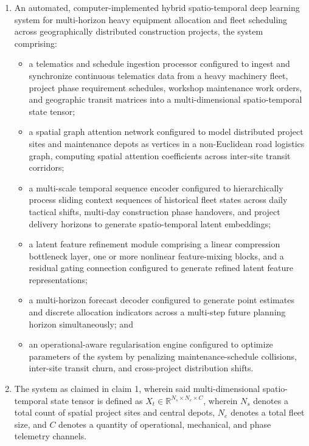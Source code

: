 \documentclass[11pt,a4paper]{article}
\begin{document}
\begin{enumerate}
    \item An automated, computer-implemented hybrid spatio-temporal deep learning system for multi-horizon heavy equipment allocation and fleet scheduling across geographically distributed construction projects, the system comprising:
    \begin{itemize}
        \item a telematics and schedule ingestion processor configured to ingest and synchronize continuous telematics data from a heavy machinery fleet, project phase requirement schedules, workshop maintenance work orders, and geographic transit matrices into a multi-dimensional spatio-temporal state tensor;
        \item a spatial graph attention network configured to model distributed project sites and maintenance depots as vertices in a non-Euclidean road logistics graph, computing spatial attention coefficients across inter-site transit corridors;
        \item a multi-scale temporal sequence encoder configured to hierarchically process sliding context sequences of historical fleet states across daily tactical shifts, multi-day construction phase handovers, and project delivery horizons to generate spatio-temporal latent embeddings;
        \item a latent feature refinement module comprising a linear compression bottleneck layer, one or more nonlinear feature-mixing blocks, and a residual gating connection configured to generate refined latent feature representations;
        \item a multi-horizon forecast decoder configured to generate point estimates and discrete allocation indicators across a multi-step future planning horizon simultaneously; and
        \item an operational-aware regularisation engine configured to optimize parameters of the system by penalizing maintenance-schedule collisions, inter-site transit churn, and cross-project distribution shifts.
    \end{itemize}

    \item The system as claimed in claim 1, wherein said multi-dimensional spatio-temporal state tensor is defined as $X_t \in \mathbb{R}^{N_s \times N_e \times C}$, wherein $N_s$ denotes a total count of spatial project sites and central depots, $N_e$ denotes a total fleet size, and $C$ denotes a quantity of operational, mechanical, and phase telemetry channels.


\end{enumerate}
\end{document}
